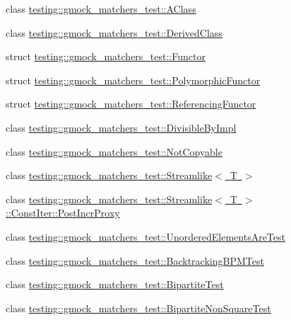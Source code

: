 \begin{DoxyCompactItemize}
class \mbox{\hyperlink{classtesting_1_1gmock__matchers__test_1_1AClass}{testing\+::gmock\+\_\+matchers\+\_\+test\+::\+A\+Class}}
\item 
class \mbox{\hyperlink{classtesting_1_1gmock__matchers__test_1_1DerivedClass}{testing\+::gmock\+\_\+matchers\+\_\+test\+::\+Derived\+Class}}
\item 
struct \mbox{\hyperlink{structtesting_1_1gmock__matchers__test_1_1Functor}{testing\+::gmock\+\_\+matchers\+\_\+test\+::\+Functor}}
\item 
struct \mbox{\hyperlink{structtesting_1_1gmock__matchers__test_1_1PolymorphicFunctor}{testing\+::gmock\+\_\+matchers\+\_\+test\+::\+Polymorphic\+Functor}}
\item 
struct \mbox{\hyperlink{structtesting_1_1gmock__matchers__test_1_1ReferencingFunctor}{testing\+::gmock\+\_\+matchers\+\_\+test\+::\+Referencing\+Functor}}
\item 
class \mbox{\hyperlink{classtesting_1_1gmock__matchers__test_1_1DivisibleByImpl}{testing\+::gmock\+\_\+matchers\+\_\+test\+::\+Divisible\+By\+Impl}}
\item 
class \mbox{\hyperlink{classtesting_1_1gmock__matchers__test_1_1NotCopyable}{testing\+::gmock\+\_\+matchers\+\_\+test\+::\+Not\+Copyable}}
\item 
class \mbox{\hyperlink{classtesting_1_1gmock__matchers__test_1_1Streamlike}{testing\+::gmock\+\_\+matchers\+\_\+test\+::\+Streamlike$<$ T $>$}}
\item 
class \mbox{\hyperlink{classtesting_1_1gmock__matchers__test_1_1Streamlike_1_1ConstIter_1_1PostIncrProxy}{testing\+::gmock\+\_\+matchers\+\_\+test\+::\+Streamlike$<$ T $>$\+::\+Const\+Iter\+::\+Post\+Incr\+Proxy}}
\item 
class \mbox{\hyperlink{classtesting_1_1gmock__matchers__test_1_1UnorderedElementsAreTest}{testing\+::gmock\+\_\+matchers\+\_\+test\+::\+Unordered\+Elements\+Are\+Test}}
\item 
class \mbox{\hyperlink{classtesting_1_1gmock__matchers__test_1_1BacktrackingBPMTest}{testing\+::gmock\+\_\+matchers\+\_\+test\+::\+Backtracking\+B\+P\+M\+Test}}
\item 
class \mbox{\hyperlink{classtesting_1_1gmock__matchers__test_1_1BipartiteTest}{testing\+::gmock\+\_\+matchers\+\_\+test\+::\+Bipartite\+Test}}
\item 
class \mbox{\hyperlink{classtesting_1_1gmock__matchers__test_1_1BipartiteNonSquareTest}{testing\+::gmock\+\_\+matchers\+\_\+test\+::\+Bipartite\+Non\+Square\+Test}}
\item 

\end{DoxyCompactItemize}
